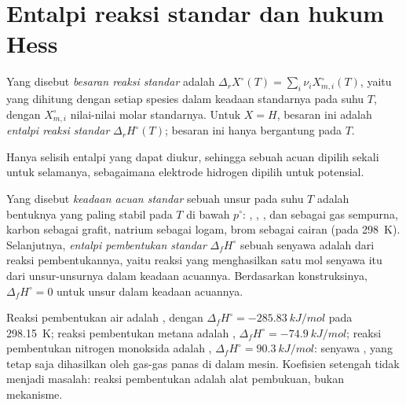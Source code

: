 \section{Entalpi reaksi standar dan hukum Hess}

\begin{definition}\label{def:b2:reaction-enthalpy:standard-reaction-enthalpy}
Yang disebut \emph{besaran reaksi standar}
adalah $\Delta_r X^\circ(T) = \sum_i\nu_iX_{m,i}^\circ(T)$, yaitu  yang dihitung dengan setiap spesies dalam keadaan standarnya pada
suhu $T$, dengan $X_{m,i}^\circ$ nilai-nilai molar standarnya. Untuk
$X = H$, besaran ini adalah \emph{entalpi reaksi
standar} $\Delta_r H^\circ(T)$; besaran ini
hanya bergantung pada $T$.
\end{definition}

Hanya selisih entalpi yang dapat diukur, sehingga sebuah acuan dipilih
sekali untuk selamanya, sebagaimana elektrode hidrogen dipilih untuk
potensial.

\begin{definition}\label{def:b2:reaction-enthalpy:formation}
Yang disebut \emph{keadaan acuan standar}
sebuah unsur pada suhu $T$ adalah bentuknya yang paling stabil pada $T$ di
bawah $p^\circ$: , , , dan  sebagai gas
sempurna, karbon sebagai grafit, natrium sebagai logam, brom sebagai
cairan (pada \qty{298}{K}). Selanjutnya, \emph{entalpi pembentukan
standar} $\Delta_f H^\circ$ sebuah
senyawa adalah  dari reaksi pembentukannya, yaitu
reaksi yang menghasilkan satu mol senyawa itu dari unsur-unsurnya dalam
keadaan acuannya. Berdasarkan konstruksinya, $\Delta_f H^\circ = 0$ untuk
unsur dalam keadaan acuannya.
\end{definition}

\begin{example}\label{ex:b2:reaction-enthalpy:formation}
Reaksi pembentukan air adalah , dengan
$\Delta_f H^\circ = \qty{-285.83}{kJ/mol}$ pada \qty{298.15}{K}; reaksi
pembentukan metana adalah , $\Delta_f H^\circ =
\qty{-74.9}{kJ/mol}$; reaksi pembentukan nitrogen monoksida adalah
, $\Delta_f H^\circ = \qty{+90.3}{kJ/mol}$:
senyawa , yang tetap saja dihasilkan oleh gas-gas panas di dalam
mesin. Koefisien setengah tidak menjadi masalah: reaksi pembentukan adalah
alat pembukuan, bukan mekanisme.
\end{example}

